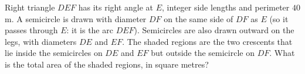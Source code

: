 Right triangle $DEF$ has its right angle at $E$, integer side lengths and perimeter $40$ m. A semicircle is drawn with diameter $DF$ on the same side of $DF$ as $E$ (so it passes through $E$: it is the arc $DEF$). Semicircles are also drawn outward on the legs, with diameters $DE$ and $EF$. The shaded regions are the two crescents that lie inside the semicircles on $DE$ and $EF$ but outside the semicircle on $DF$. What is the total area of the shaded regions, in square metres?
